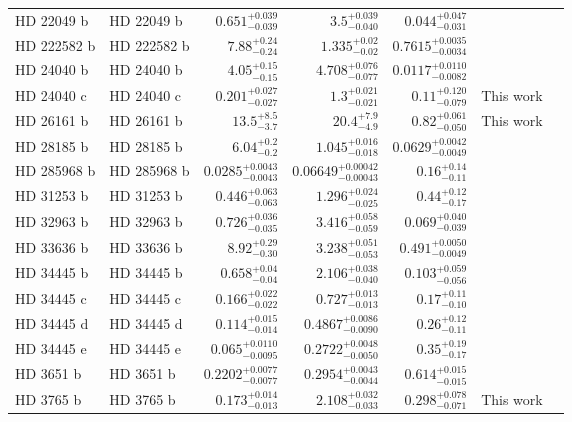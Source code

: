 \begin{longtable*}{llrrrrr}
HD 22049 b & HD 22049 b & $0.651^{+0.039}_{-0.039}$ & $3.5^{+0.039}_{-0.040}$ & $0.044^{+0.047}_{-0.031}$ & \cite{Hatzes00} & \\ 
HD 222582 b & HD 222582 b & $7.88^{+0.24}_{-0.24}$ & $1.335^{+0.02}_{-0.02}$ & $0.7615^{+0.0035}_{-0.0034}$ & \cite{Vogt00} & \\ 
HD 24040 b & HD 24040 b & $4.05^{+0.15}_{-0.15}$ & $4.708^{+0.076}_{-0.077}$ & $0.0117^{+0.0110}_{-0.0082}$ & \cite{Boisse12} & \\ 
HD 24040 c & HD 24040 c & $0.201^{+0.027}_{-0.027}$ & $1.3^{+0.021}_{-0.021}$ & $0.11^{+0.120}_{-0.079}$ & This work & \\ 
HD 26161 b & HD 26161 b & $13.5^{+8.5}_{-3.7}$ & $20.4^{+7.9}_{-4.9}$ & $0.82^{+0.061}_{-0.050}$ & This work & \\ 
HD 28185 b & HD 28185 b & $6.04^{+0.2}_{-0.2}$ & $1.045^{+0.016}_{-0.018}$ & $0.0629^{+0.0042}_{-0.0049}$ & \cite{Santos01} & \\ 
HD 285968 b & HD 285968 b & $0.0285^{+0.0043}_{-0.0043}$ & $0.06649^{+0.00042}_{-0.00043}$ & $0.16^{+0.14}_{-0.11}$ & \cite{Forveille09} & \\ 
HD 31253 b & HD 31253 b & $0.446^{+0.063}_{-0.063}$ & $1.296^{+0.024}_{-0.025}$ & $0.44^{+0.12}_{-0.17}$ & \cite{Meschiari11} & \\ 
HD 32963 b & HD 32963 b & $0.726^{+0.036}_{-0.035}$ & $3.416^{+0.058}_{-0.059}$ & $0.069^{+0.040}_{-0.039}$ & \cite{Rowan16} & \\ 
HD 33636 b & HD 33636 b & $8.92^{+0.29}_{-0.30}$ & $3.238^{+0.051}_{-0.053}$ & $0.491^{+0.0050}_{-0.0049}$ & \cite{Vogt02} & \\ 
HD 34445 b & HD 34445 b & $0.658^{+0.04}_{-0.04}$ & $2.106^{+0.038}_{-0.040}$ & $0.103^{+0.059}_{-0.056}$ & \cite{Howard10} & \\ 
HD 34445 c & HD 34445 c & $0.166^{+0.022}_{-0.022}$ & $0.727^{+0.013}_{-0.013}$ & $0.17^{+0.11}_{-0.10}$ & \cite{Vogt17} & \\ 
HD 34445 d & HD 34445 d & $0.114^{+0.015}_{-0.014}$ & $0.4867^{+0.0086}_{-0.0090}$ & $0.26^{+0.12}_{-0.11}$ & \cite{Vogt17} & \\ 
HD 34445 e & HD 34445 e & $0.065^{+0.0110}_{-0.0095}$ & $0.2722^{+0.0048}_{-0.0050}$ & $0.35^{+0.19}_{-0.17}$ & \cite{Vogt17} & \\ 
HD 3651 b & HD 3651 b & $0.2202^{+0.0077}_{-0.0077}$ & $0.2954^{+0.0043}_{-0.0044}$ & $0.614^{+0.015}_{-0.015}$ & \cite{Butler06} & \\ 
HD 3765 b & HD 3765 b & $0.173^{+0.014}_{-0.013}$ & $2.108^{+0.032}_{-0.033}$ & $0.298^{+0.078}_{-0.071}$ & This work & \\ 

\end{longtable*}
